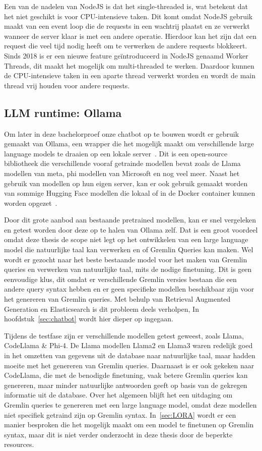 Een van de nadelen van NodeJS is dat het single-threaded is, wat betekent dat het niet geschikt is voor CPU-intensieve taken.
Dit komt omdat NodeJS gebruik maakt van een event loop die de requests in een wachtrij plaatst en ze verwerkt wanneer de server klaar is met een andere operatie.
Hierdoor kan het zijn dat een request die veel tijd nodig heeft om te verwerken de andere requests blokkeert.
Sinds 2018 is er een nieuwe feature geïntroduceerd in NodeJS genaamd Worker Threads, dit maakt het mogelijk om multi-threaded te werken.
Daardoor kunnen de CPU-intensieve taken in een aparte thread verwerkt worden en wordt de main thread vrij houden voor andere requests.

\subsection{LLM runtime: Ollama}
Om later in deze bachelorproef onze chatbot op te bouwen wordt er gebruik gemaakt van Ollama, een wrapper die het mogelijk maakt om verschillende large language models te draaien op een lokale server~\autocite{Manandhar2025}. 
Dit is een open-source bibliotheek die verschillende vooraf getrainde modellen bevat zoals de Llama modellen van meta, phi modellen van Microsoft en nog veel meer.
Naast het gebruik van modellen op hun eigen server, kan er ook gebruik gemaakt worden van sommige Hugging Face modellen die lokaal of in de Docker container kunnen worden opgezet~\autocite{HuggingFace2024}.

Door dit grote aanbod aan bestaande pretrained modellen, kan er snel vergeleken en getest worden door deze op te halen van Ollama zelf.
Dat is een groot voordeel omdat deze thesis de scope niet legt op het ontwikkelen van een large language model die natuurlijke taal kan verwerken en of Gremlin Queries kan maken.
Wel wordt er gezocht naar het beste bestaande model voor het maken van Gremlin queries en verwerken van natuurlijke taal, mits de nodige finetuning. 
Dit is geen eenvoudige klus, dit omdat er verschillende Gremlin versies bestaan die een andere query syntax hebben en er geen specifieke modellen beschikbaar zijn voor het genereren van Gremlin queries.
Met behulp van Retrieval Augmented Generation en Elasticsearch is dit probleem deels verholpen, In hoofdstuk~\ref{sec:chatbot} wordt hier dieper op ingegaan.

Tijdens de testfase zijn er verschillende modellen getest geweest, zoals Llama, CodeLlama \& Phi-4.
De Llama modellen Llama2 en Llama3 waren redelijk goed in het omzetten van gegevens uit de database naar natuurlijke taal, maar hadden moeite met het genereren van Gremlin queries.
Daarnaast is er ook gekeken naar CodeLlama, die met de benodigde finetuning, vaak betere Gremlin queries kan genereren, maar minder natuurlijke antwoorden geeft op basis van de gekregen informatie uit de database.
Over het algemeen blijft het een uitdaging om Gremlin queries te genereren met een large language model, omdat deze modellen niet specifiek getraind zijn op Gremlin syntax.
In~\ref{sec:LORA} wordt er een manier besproken die het mogelijk maakt om een model te finetunen op Gremlin syntax, maar dit is niet verder onderzocht in deze thesis door de beperkte resources.


